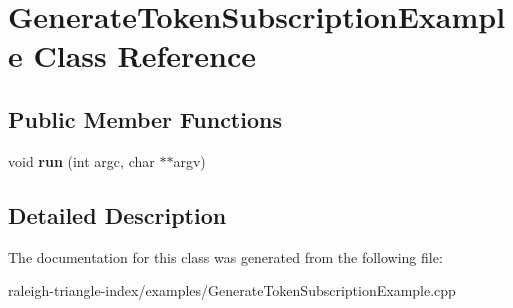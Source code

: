 \section{Generate\+Token\+Subscription\+Example Class Reference}
\label{class_generate_token_subscription_example}
\subsection*{Public Member Functions}
\begin{DoxyCompactItemize}
\item 
void {\bfseries run} (int argc, char $\ast$$\ast$argv)\label{class_generate_token_subscription_example_a040f90bde148752a7c33a81801bba017}

\end{DoxyCompactItemize}


\subsection{Detailed Description}


The documentation for this class was generated from the following file\+:\begin{DoxyCompactItemize}
\item 
raleigh-\/triangle-\/index/examples/Generate\+Token\+Subscription\+Example.\+cpp\end{DoxyCompactItemize}
